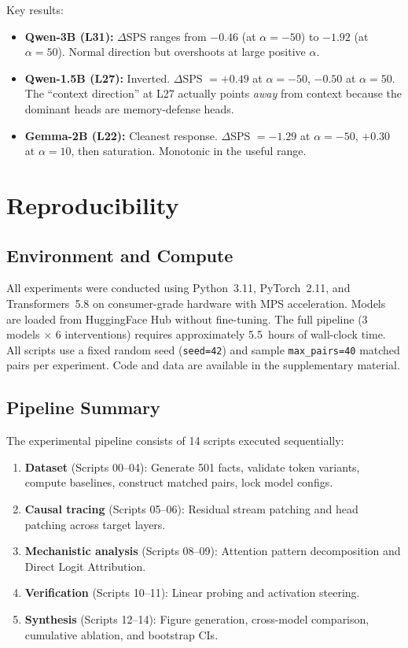 \documentclass{article}
\begin{document}
Key results:
\begin{itemize}
    \item \textbf{Qwen-3B (L31):} $\Delta$SPS ranges from $-0.46$ (at $\alpha{=}{-}50$) to $-1.92$ (at $\alpha{=}50$). Normal direction but overshoots at large positive $\alpha$.
    \item \textbf{Qwen-1.5B (L27):} Inverted. $\Delta$SPS $= +0.49$ at $\alpha{=}{-}50$, $-0.50$ at $\alpha{=}50$. The ``context direction'' at L27 actually points \emph{away} from context because the dominant heads are memory-defense heads.
    \item \textbf{Gemma-2B (L22):} Cleanest response. $\Delta$SPS $= -1.29$ at $\alpha{=}{-}50$, $+0.30$ at $\alpha{=}10$, then saturation. Monotonic in the useful range.
\end{itemize}

\section{Reproducibility}
\label{app:reproduce}

\subsection{Environment and Compute}

All experiments were conducted using Python~3.11, PyTorch~2.11, and Transformers~5.8 on consumer-grade hardware with MPS acceleration. Models are loaded from HuggingFace Hub without fine-tuning. The full pipeline (3 models $\times$ 6 interventions) requires approximately 5.5~hours of wall-clock time. All scripts use a fixed random seed (\texttt{seed=42}) and sample \texttt{max\_pairs=40} matched pairs per experiment. Code and data are available in the supplementary material.

\subsection{Pipeline Summary}

The experimental pipeline consists of 14 scripts executed sequentially:
\begin{enumerate}
    \item \textbf{Dataset} (Scripts 00--04): Generate 501 facts, validate token variants, compute baselines, construct matched pairs, lock model configs.
    \item \textbf{Causal tracing} (Scripts 05--06): Residual stream patching and head patching across target layers.
    \item \textbf{Mechanistic analysis} (Scripts 08--09): Attention pattern decomposition and Direct Logit Attribution.
    \item \textbf{Verification} (Scripts 10--11): Linear probing and activation steering.
    \item \textbf{Synthesis} (Scripts 12--14): Figure generation, cross-model comparison, cumulative ablation, and bootstrap CIs.
\end{enumerate}
\end{document}
